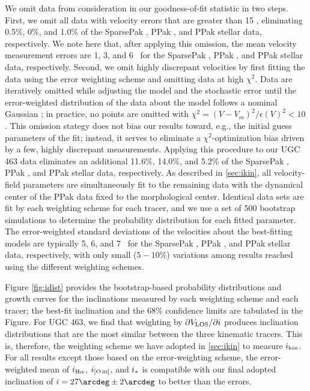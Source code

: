 \documentclass[apj,iop,numberedappendix]{emulateapj}
\begin{document}
We omit data from consideration in our goodness-of-fit statistic in two steps.
First, we omit all data with velocity errors that are greater than 15 \kms,
eliminating 0.5\%, 0\%, and 1.0\% of the SparsePak \halp, PPak \oiii, and PPak
stellar data, respectively.  We note here that, after applying this omission,
the mean velocity measurement errors are 1, 3, and 6 \kms\ for the SparsePak
\halp, PPak \oiii, and PPak stellar data, respectively.  Second, we omit highly
discrepant velocities by first fitting the data using the error weighting scheme
and omitting data at high $\chi^2$.  Data are iteratively omitted while
adjusting the model and the stochastic error until the error-weighted
distribution of the data about the model follows a nominal Gaussian
\citep{KBWPhD}; in practice, no points are omitted with $\chi^2 = (V -
V_m)^2/\epsilon(V)^2 < 10$.  This omission stategy does not bias our results
toward, e.g., the initial guess parameters of the fit; instead, it serves to
eliminate a $\chi^2$-optimization bias driven by a few, highly discrepant
measurements.  Applying this procedure to our UGC 463 data eliminates an
additional 11.6\%, 14.0\%, and 5.2\% of the SparsePak \halp, PPak \oiii, and
PPak stellar data, respectively.  As described in \sect \ref{sec:ikin}, all
velocity-field parameters are simultaneously fit to the remaining data with the
dynamical center of the PPak data fixed to the morphological center.  Identical
data sets are fit by each weighting scheme for each tracer, and we use a set of
500 bootstrap simulations \citep[see .2 of][]{NR3} to determine the
probability distribution for each fitted parameter.  The error-weighted standard
deviations of the velocities about the best-fitting models are typically 5, 6,
and 7 \kms\ for the SparsePak \halp, PPak \oiii, and PPak stellar data,
respectively, with only small ($5-10$\%) variations among results reached using
the different weighting schemes.

Figure \ref{fig:idist} provides the bootstrap-based probability distributions
and growth curves for the inclinations measured by each weighting scheme and
each tracer; the best-fit inclination and the 68\% confidence limits are
tabulated in the Figure.  For UGC 463, we find that weighting by
$\partial V_{\rm LOS}/\partial i$ produces inclination distributions that are the most
similar between the three kinematic tracers.  This is, therefore, the weighting
scheme we have adopted in \sect \ref{sec:ikin} to measure $i_{\rm kin}$.  For all
results except those based on the error-weighting scheme, the error-weighted
mean of $i_{\mbox{\scriptsize H$\alpha$}}$, $i_{\mbox{\scriptsize [O{\scshape$~\!$iii}]}}$, and $i_{\ast}$ is compatible with our final adopted
inclination of $i=27\arcdeg\pm2\arcdeg$ to better than the errors.
\end{document}
